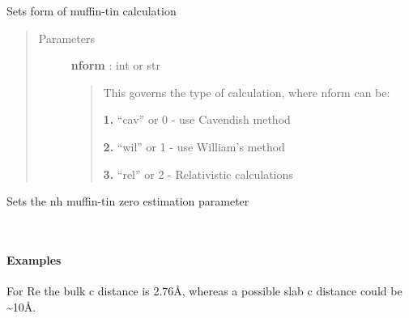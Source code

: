 \documentclass[letterpaper,10pt,english]{sphinxmanual}
\begin{document}
\begin{fulllineitems}

\begin{fulllineitems}
\label{modules:phaseshifts.model.MTZ_model.set_nform}
Sets form of muffin-tin calculation
\begin{quote}\begin{description}
\item[{Parameters}] \leavevmode
\textbf{nform} : int or str
\begin{quote}

This governs the type of calculation, where nform can be:

\textbf{1.} ``cav'' or 0 - use Cavendish method

\textbf{2.} ``wil'' or 1 - use William's method

\textbf{3.} ``rel'' or 2 - Relativistic calculations
\end{quote}

\end{description}\end{quote}

\end{fulllineitems}


\begin{fulllineitems}
\label{modules:phaseshifts.model.MTZ_model.set_nh}
Sets the nh muffin-tin zero estimation parameter

\end{fulllineitems}


\begin{fulllineitems}
\label{modules:phaseshifts.model.MTZ_model.set_slab_c}~\paragraph{Examples}

For Re the bulk c distance is 2.76Å, whereas a possible slab c distance
could be \textasciitilde{}10Å.

\end{fulllineitems}


\end{fulllineitems}
\end{document}
